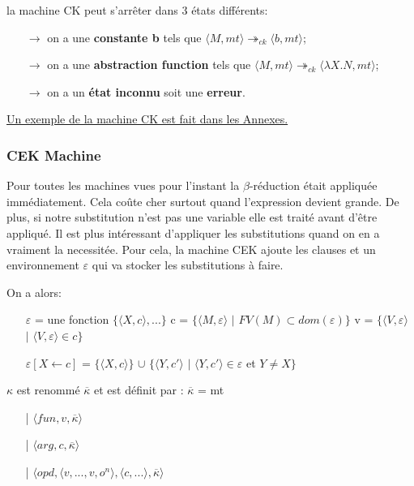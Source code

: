 \documentclass[10pt,a4paper]{article}
\begin{document}
					la machine CK peut s'arrêter dans 3 états différents:
					\begin{itemize}
						\item[]$\longrightarrow$ on a une \textbf{constante b} tels que $\langle M,mt\rangle \twoheadrightarrow_{ck} \langle b,mt\rangle$;
						\item[]$\longrightarrow$ on a une \textbf{abstraction function} tels que $\langle M,mt\rangle \twoheadrightarrow_{ck} \langle\lambda X.N,mt\rangle$;
						\item[]$\longrightarrow$ on a un \textbf{état inconnu} soit une \textbf{erreur}.
					\end{itemize}
				
					\hyperref[CK]{Un exemple de la machine CK est fait dans les Annexes.}
					\bigbreak
				
				\subsubsection{CEK Machine}
					Pour toutes les machines vues pour l'instant la $\beta$-réduction était appliquée immédiatement. Cela coûte cher surtout quand l'expression devient grande. De plus, si notre substitution n'est pas une variable elle est traité avant d'être appliqué.
					\smallbreak
					Il est plus intéressant d'appliquer les substitutions quand on en a vraiment la necessitée. Pour cela, la machine CEK ajoute les clauses et un environnement $\varepsilon$ qui va stocker les substitutions à faire.
					\medbreak
					
					On a alors:
					\begin{itemize}
						\item[] $\varepsilon$ = une fonction $\{\langle X,c\rangle,...\}$    c = $\{\langle M,\varepsilon\rangle$ $|$ $FV(M)\subset dom(\varepsilon)\}$    v = $\{\langle V,\varepsilon\rangle$ $|$ $\langle V,\varepsilon\rangle \in c\}$
						\item[] $\varepsilon[X \leftarrow c]$ = $\{\langle X,c\rangle\}$ $\cup$ $\{\langle Y,c'\rangle$ $|$ $\langle Y,c'\rangle \in \varepsilon$ et $ Y \neq X\}$
					\end{itemize}
					\medbreak
					
					$\kappa$ est renommé $\overline{\kappa}$ et est définit par :
					\smallbreak
					$\overline{\kappa}$ = mt
					\begin{itemize}
						\item[|] $\langle fun,v,\overline{\kappa} \rangle$
						\item[|] $\langle arg,c,\overline{\kappa} \rangle$
						\item[|] $\langle opd,\langle v,...,v,o^{n}\rangle,\langle c,... \rangle,\overline{\kappa} \rangle$
					\end{itemize}
					\bigbreak
					
\end{document}
